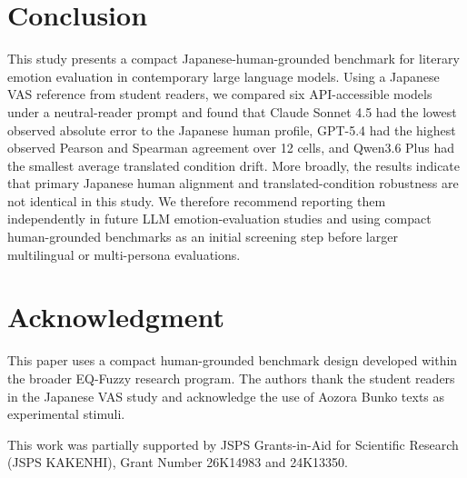 \documentclass[conference,a4paper]{IEEEtran}
\begin{document}
\section{Conclusion}
This study presents a compact Japanese-human-grounded benchmark for literary emotion evaluation in contemporary large language models. Using a Japanese VAS reference from student readers, we compared six API-accessible models under a neutral-reader prompt and found that Claude Sonnet 4.5 had the lowest observed absolute error to the Japanese human profile, GPT-5.4 had the highest observed Pearson and Spearman agreement over 12 cells, and Qwen3.6 Plus had the smallest average translated condition drift. More broadly, the results indicate that primary Japanese human alignment and translated-condition robustness are not identical in this study. We therefore recommend reporting them independently in future LLM emotion-evaluation studies and using compact human-grounded benchmarks as an initial screening step before larger multilingual or multi-persona evaluations.

\section*{Acknowledgment}
This paper uses a compact human-grounded benchmark design developed within the broader EQ-Fuzzy research program. The authors thank the student readers in the Japanese VAS study and acknowledge the use of Aozora Bunko texts as experimental stimuli.

This work was partially supported by JSPS Grants-in-Aid for Scientific Research (JSPS KAKENHI), Grant Number 26K14983 and 24K13350.
\end{document}
